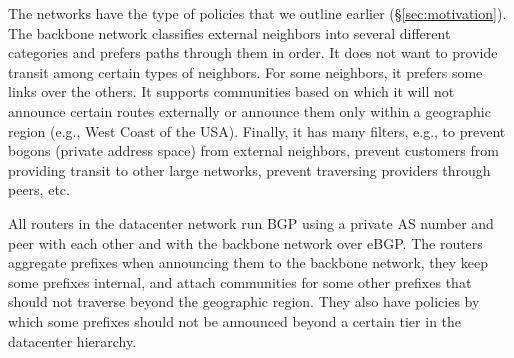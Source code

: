\documentclass{sig-alternate-10pt}
\begin{document}
The networks have the type of policies that we outline earlier (\S\ref{sec:motivation}). The backbone network classifies external neighbors into several different categories and prefers paths through them in order. It does not want to provide transit among certain types of neighbors. For some neighbors, it prefers some links over the others. It supports communities based on which it will not announce certain routes externally or announce them only within a geographic region (e.g., West Coast of the USA). Finally, it has many filters, e.g., to prevent bogons (private address space) from external neighbors, prevent customers from providing transit to other large networks, prevent traversing providers through peers, etc.

All routers in the datacenter network run BGP using a private AS number and peer with each other and with the backbone network over eBGP. The routers aggregate prefixes when announcing them to the backbone network, they keep some prefixes internal, and attach communities for some other prefixes that should not traverse beyond the geographic region. They also have policies by which some prefixes should not be announced beyond a certain tier in the datacenter hierarchy.
\end{document}

